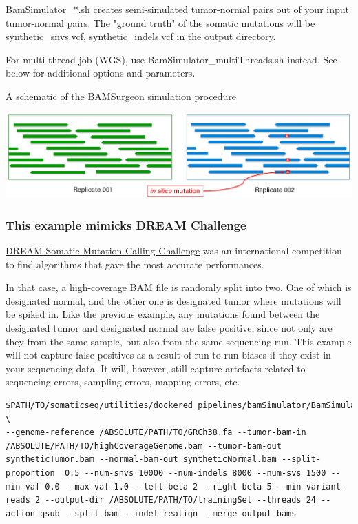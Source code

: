 \documentclass[10pt,letterpaper]{article}
\begin{document}
\begin{sloppypar}
BamSimulator\_*.sh creates semi-simulated tumor-normal pairs out of your input tumor-normal pairs. The "ground truth" of the somatic mutations will be synthetic\_snvs.vcf, synthetic\_indels.vcf in the output directory.

For multi-thread job (WGS), use BamSimulator\_multiThreads.sh instead. See below for additional options and parameters.


A schematic of the BAMSurgeon simulation procedure


\begin{center}

  \includegraphics[width=6.5in]{../somaticseq/utilities/dockered_pipelines/bamSimulator/replicate_sim.jpg}
\end{center}





\subsubsection{This example mimicks DREAM Challenge}

\href{https://www.synapse.org/#!Synapse:syn312572/wiki/70726}{DREAM Somatic Mutation Calling Challenge} was an international competition to find algorithms that gave the most accurate performances. 

In that case, a high-coverage BAM file is randomly split into two. One of which is designated normal, and the other one is designated tumor where mutations will be spiked in. Like the previous example, any mutations found between the designated tumor and designated normal are false positive, since not only are they from the same sample, but also from the same sequencing run. This example will not capture false positives as a result of run-to-run biases if they exist in your sequencing data. It will, however, still capture artefacts related to sequencing errors, sampling errors, mapping errors, etc.


\begin{lstlisting}
$PATH/TO/somaticseq/utilities/dockered_pipelines/bamSimulator/BamSimulator_multiThreads.sh \
--genome-reference /ABSOLUTE/PATH/TO/GRCh38.fa --tumor-bam-in /ABSOLUTE/PATH/TO/highCoverageGenome.bam --tumor-bam-out syntheticTumor.bam --normal-bam-out syntheticNormal.bam --split-proportion  0.5 --num-snvs 10000 --num-indels 8000 --num-svs 1500 --min-vaf 0.0 --max-vaf 1.0 --left-beta 2 --right-beta 5 --min-variant-reads 2 --output-dir /ABSOLUTE/PATH/TO/trainingSet --threads 24 --action qsub --split-bam --indel-realign --merge-output-bams
\end{lstlisting}


\end{sloppypar}
\end{document}

